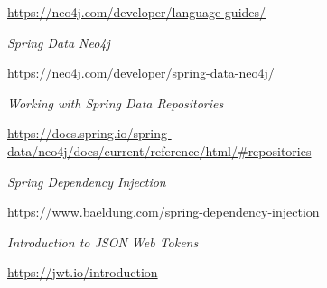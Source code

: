 \documentclass[12pt,a4paper]{report}
\begin{document}
\begin{thebibliography}{9}
  \url{https://neo4j.com/developer/language-guides/}
  
  
  \textit{Spring Data Neo4j}
  
  \url{https://neo4j.com/developer/spring-data-neo4j/}
  
  
  \textit{Working with Spring Data Repositories}
  
  \url{https://docs.spring.io/spring-data/neo4j/docs/current/reference/html/#repositories}
  
  
  \textit{Spring Dependency Injection}
  
  \url{https://www.baeldung.com/spring-dependency-injection}
  
  
  \textit{Introduction to JSON Web Tokens}
  
  \url{https://jwt.io/introduction}
  
  


\end{thebibliography}
\end{document}
